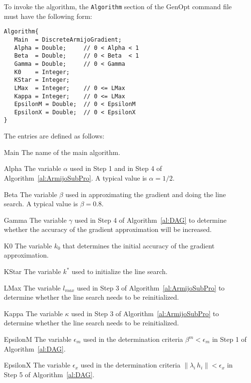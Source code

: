 To invoke the algorithm, 
the \texttt{Algorithm} section of the GenOpt command file must have the following form:
\begin{lstlisting}
Algorithm{
   Main  = DiscreteArmijoGradient;
   Alpha = Double;     // 0 < Alpha < 1
   Beta  = Double;     // 0 < Beta  < 1
   Gamma = Double;     // 0 < Gamma
   K0    = Integer;
   KStar = Integer;
   LMax  = Integer;    // 0 <= LMax
   Kappa = Integer;    // 0 <= LMax
   EpsilonM = Double;  // 0 < EpsilonM
   EpsilonX = Double;  // 0 < EpsilonX
}
\end{lstlisting}
The entries are defined as follows:
\begin{codedescription}
\item [Main]
The name of the main algorithm.
\item [Alpha]
The variable $\alpha$ used in Step 1 and in Step 4 of Algorithm~\ref{al:ArmijoSubPro}.
A typical value is $\alpha = 1/2$.
\item [Beta]
The variable $\beta$ used in approximating
the gradient and doing the line search.
A typical value is $\beta = 0.8$.
\item [Gamma]
The variable $\gamma$ used in Step 4 of Algorithm~\ref{al:DAG} 
to determine
whether the accuracy of the gradient approximation will be increased.
\item [K0]
The variable $k_0$ that determines the initial accuracy
of the gradient approximation.
\item [KStar]
The variable $k^*$ used to initialize the line search.
\item [LMax]
The variable $l_{max}$ used in Step 3 of Algorithm~\ref{al:ArmijoSubPro}
to determine whether the line search needs to be reinitialized.
\item [Kappa]
The variable $\kappa$ used in Step 3 of Algorithm~\ref{al:ArmijoSubPro}
to determine whether the line search needs to be reinitialized.
\item [EpsilonM]
The variable $\epsilon_m$ used in the determination criteria
$\beta^m < \epsilon_m$ in Step 1 of Algorithm~\ref{al:DAG}.
\item [EpsilonX]
The variable $\epsilon_x$ used in the determination criteria
$\| \lambda_i \, h_i \| < \epsilon_x$ in Step 5 of Algorithm~\ref{al:DAG}.
\end{codedescription}




